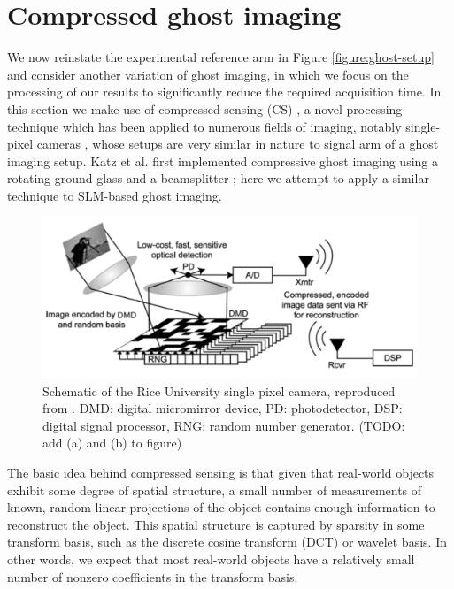 \section{Compressed ghost imaging}

We now reinstate the experimental reference arm in Figure \ref{figure:ghost-setup} and consider another variation of ghost imaging, in which we focus on the processing of our results to significantly reduce the required acquisition time. In this section we make use of compressed sensing (CS) \cite{candes-stable}, a novel processing technique which has been applied to numerous fields of imaging, notably single-pixel cameras \cite{duarte-single}, whose setups are very similar in nature to signal arm of a ghost imaging setup. Katz et al. first implemented compressive ghost imaging using a rotating ground glass and a beamsplitter \cite{katz-compressive}; here we attempt to apply a similar technique to SLM-based ghost imaging.

\begin{figure}[t]
\begin{center}
\includegraphics[width=14cm]{figure-ghost-cscam.pdf}
\caption{Schematic of the Rice University single pixel camera, reproduced from \cite{takhar-new}. DMD: digital micromirror device, PD: photodetector, DSP: digital signal processor, RNG: random number generator. (TODO: add (a) and (b) to figure)}
\label{figure:ghost-cscam}
\end{center}
\end{figure}

The basic idea behind compressed sensing is that given that real-world objects exhibit some degree of spatial structure, a small number of measurements of known, random linear projections of the object contains enough information to reconstruct the object. This spatial structure is captured by sparsity in some transform basis, such as the discrete cosine transform (DCT) or wavelet basis. In other words, we expect that most real-world objects have a relatively small number of nonzero coefficients in the transform basis.

